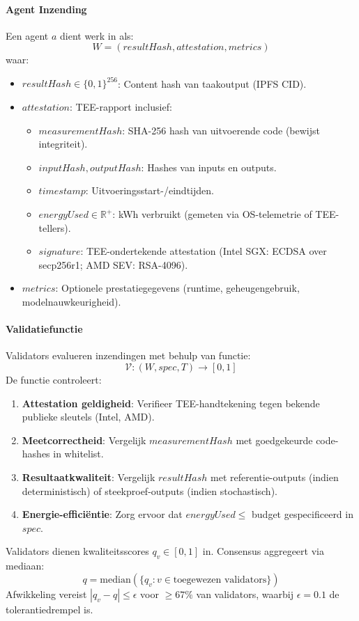 \documentclass[11pt]{article}
\begin{document}
\paragraph{Agent Inzending} Een agent $a$ dient werk in als:
\begin{equation}
W = (resultHash, attestation, metrics)
\end{equation}
waar:
\begin{itemize}[noitemsep]
  \item $resultHash \in \{0,1\}^{256}$: Content hash van taakoutput (IPFS CID).
  \item $attestation$: TEE-rapport inclusief:
    \begin{itemize}[noitemsep]
      \item $measurementHash$: SHA-256 hash van uitvoerende code (bewijst integriteit).
      \item $inputHash, outputHash$: Hashes van inputs en outputs.
      \item $timestamp$: Uitvoeringsstart-/eindtijden.
      \item $energyUsed \in \mathbb{R}^+$: kWh verbruikt (gemeten via OS-telemetrie of TEE-tellers).
      \item $signature$: TEE-ondertekende attestation (Intel SGX: ECDSA over secp256r1; AMD SEV: RSA-4096).
    \end{itemize}
  \item $metrics$: Optionele prestatiegegevens (runtime, geheugengebruik, modelnauwkeurigheid).
\end{itemize}

\paragraph{Validatiefunctie} Validators evalueren inzendingen met behulp van functie:
\begin{equation}
\mathcal{V}: (W, spec, T) \rightarrow [0, 1]
\end{equation}
De functie controleert:
\begin{enumerate}[noitemsep]
  \item \textbf{Attestation geldigheid}: Verifieer TEE-handtekening tegen bekende publieke sleutels (Intel, AMD).
  \item \textbf{Meetcorrectheid}: Vergelijk $measurementHash$ met goedgekeurde code-hashes in whitelist.
  \item \textbf{Resultaatkwaliteit}: Vergelijk $resultHash$ met referentie-outputs (indien deterministisch) of steekproef-outputs (indien stochastisch).
  \item \textbf{Energie-efficiëntie}: Zorg ervoor dat $energyUsed \leq$ budget gespecificeerd in $spec$.
\end{enumerate}
Validators dienen kwaliteitsscores $q_v \in [0,1]$ in. Consensus aggregeert via mediaan:
\begin{equation}
q = \text{median}(\{q_v : v \in \text{toegewezen validators}\})
\end{equation}
Afwikkeling vereist $|q_v - q| \leq \epsilon$ voor $\geq 67\%$ van validators, waarbij $\epsilon = 0.1$ de tolerantiedrempel is.
\end{document}
